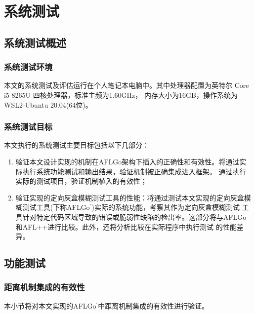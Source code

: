\documentclass[bachelor]{njupthesis}
\begin{document}
\chapter{系统测试}
\section{系统测试概述}
\subsection{系统测试环境}
本文的系统测试及评估运行在个人笔记本电脑中。其中处理器配置为英特尔 Core i5-8265U 四核处理器，标准主频为1.60GHz，
内存大小为16GB，操作系统为WSL2-Ubuntu 20.04(64位)。

\subsection{系统测试目标}
本文执行的系统测试主要目标包括以下几部分：
\begin{enumerate}[label=(\arabic*)]
	\item 验证本文设计实现的机制在AFLGo架构下插入的正确性和有效性。将通过实际执行系统功能测试和输出结果，验证机制被正确集成进入框架。
	通过执行实际的测试项目，验证机制植入的有效性；
	\item 验证实现的定向灰盒模糊测试工具的性能：将通过测试本文实现的定向灰盒模糊测试工具(下称AFLGo$^\prime$)实际的系统功能，考察其作为定向灰盒模糊测试
	工具针对特定代码区域导致的错误或脆弱性缺陷的检出率。这部分将与AFLGo和AFL++\cite{aflpp}进行比较。此外，还将分析比较在实际程序中执行测试
	的性能差异。
\end{enumerate}

\section{功能测试}
\subsection{距离机制集成的有效性}
本小节将对本文实现的AFLGo$^\prime$中距离机制集成的有效性进行验证。
\end{document}
